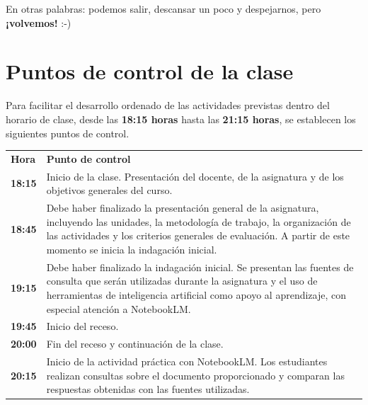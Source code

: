 \documentclass[12pt,a4paper]{article}
\begin{document}
En otras palabras: podemos salir, descansar un poco y despejarnos, pero
\textbf{¡volvemos!} :-)

\section{Puntos de control de la clase}

Para facilitar el desarrollo ordenado de las actividades previstas dentro
 del horario de clase, desde las \textbf{18:15 horas} hasta las
\textbf{21:15 horas}, se establecen los siguientes puntos de control.

\begin{center}
\renewcommand{\arraystretch}{1.35}

\begin{tabularx}{\textwidth}{
    >{\centering\arraybackslash}p{2.2cm}
    X
}
\rowcolor{calAzul}
\color{white}\textbf{Hora} &
\color{white}\textbf{Punto de control} \\

\rowcolor{calAzulClaro}
\textbf{18:15} &
Inicio de la clase. Presentación del docente, de la asignatura y de los
objetivos generales del curso. \\

\rowcolor{calAzulClaro}
\textbf{18:45} &
Debe haber finalizado la presentación general de la asignatura, incluyendo
las unidades, la metodología de trabajo, la organización de las actividades
y los criterios generales de evaluación. A partir de este momento se inicia
la indagación inicial. \\

\rowcolor{calVerdeClaro}
\textbf{19:15} &
Debe haber finalizado la indagación inicial. Se presentan las fuentes de
consulta que serán utilizadas durante la asignatura y el uso de herramientas
de inteligencia artificial como apoyo al aprendizaje, con especial atención
a NotebookLM. \\

\rowcolor{calAmarilloClaro}
\textbf{19:45} &
Inicio del receso. \\

\rowcolor{calAmarilloClaro}
\textbf{20:00} &
Fin del receso y continuación de la clase. \\

\rowcolor{calVerdeClaro}
\textbf{20:15} &
Inicio de la actividad práctica con NotebookLM. Los estudiantes realizan
consultas sobre el documento proporcionado y comparan las respuestas
obtenidas con las fuentes utilizadas. \\


\end{tabularx}
\end{center}
\end{document}
